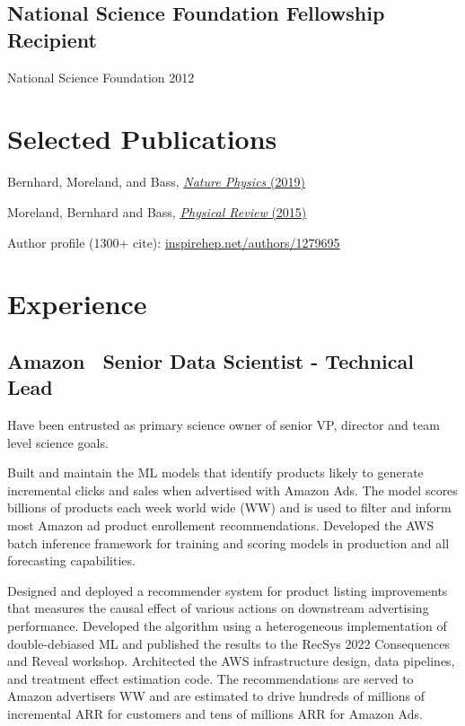 \documentclass[letterpaper,10pt]{article}
\begin{document}
\begin{multicols}{2}
\subsection{National Science Foundation Fellowship Recipient}
{\small National Science Foundation \hfill 2012}

\section{Selected Publications}
\smallskip

Bernhard, Moreland, and Bass,
\href{https://www.nature.com/articles/s41567-019-0611-8}{\emph{Nature Physics} (2019)}

Moreland, Bernhard and Bass,
\href{https://arxiv.org/abs/1412.4708}{\emph{Physical Review} (2015)}

Author profile (1300+ cite):
\href{https://inspirehep.net/authors/1279695}{inspirehep.net/authors/1279695}

\columnbreak

\section{Experience}

\subsection{Amazon \textbar\ Senior Data Scientist - Technical Lead}
\smallskip

Have been entrusted as primary science owner of senior VP, director and
team level science goals.

Built and maintain the ML models that identify products likely
to generate incremental clicks and sales when advertised with Amazon Ads. The
model scores billions of products each week world wide (WW) and is used to
filter and inform most Amazon ad product enrollement recommendations.
Developed the AWS batch inference framework for training and scoring models
in production and all forecasting capabilities.

Designed and deployed a recommender system for product
listing improvements that measures the causal effect of various actions on
downstream advertising performance. Developed the algorithm using a heterogeneous
implementation of double-debiased ML and published the results to the RecSys 2022
Consequences and Reveal workshop. Architected the AWS infrastructure design, data
pipelines, and treatment effect estimation code. The recommendations are served to
Amazon advertisers WW and are estimated to drive hundreds of millions
of incremental ARR for customers and tens of millions ARR for Amazon Ads.


\end{multicols}
\end{document}
